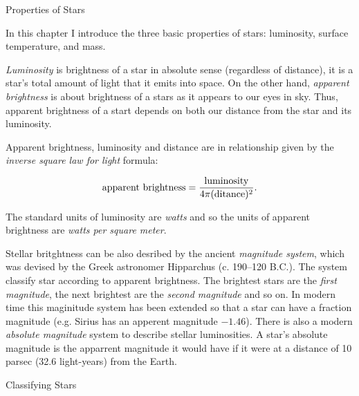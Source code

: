 \sec Properties of Stars

In this chapter I introduce the three basic properties of stars: luminosity,
surface temperature, and mass.

{\em Luminosity} is brightness of a star in absolute sense (regardless of
distance), it is a star's total amount of light that it emits into space.
On the other hand, {\em apparent brightness} is about brightness of a stars
as it appears to our eyes in sky. Thus, apparent brightness of a start
depends on both our distance from the star and its luminosity.

Apparent brightness, luminosity and distance are in relationship given by
the {\em inverse square law for light} formula:

$${\rm apparent \ brightness} = {{\rm luminosity} \over
{4 \pi ({\rm ditance}) ^ 2}}.$$

The standard units of luminosity are {\em watts} and so the units of apparent
brightness are {\em watts per square meter}.

Stellar britghtness can be also desribed by the ancient {\em magnitude system},
which was devised by the Greek astronomer Hipparchus (c. 190--120 B.C.).
The system classify star according to apparent brightness. The brightest stars
are the {\em first magnitude}, the next brightest are the {\em second magnitude}
and so on. In modern time this maginitude system has been extended so that
a star can have a fraction magnitude (e.g. Sirius has an apperent magnitude
$-1.46$). There is also a modern {\em absolute magnitude} system to describe
stellar luminosities. A star's absolute magnitude is the apparrent magnitude
it would have if it were at a distance of 10\,parsec (32.6 light-years) from
the Earth.

\sec Classifying Stars
